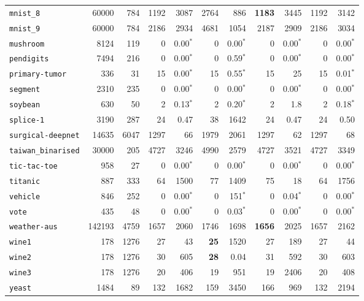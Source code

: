 \begin{tabular}{lccrrrrrrrr}
\texttt{mnist\_8} & \multicolumn{1}{r}{60000} & \multicolumn{1}{r}{784}  & 1192 & 3087 & 2764 & 886 & \textbf{1183} & 3445 & 1192 & 3142\\
\texttt{mnist\_9} & \multicolumn{1}{r}{60000} & \multicolumn{1}{r}{784}  & 2186 & 2934 & 4681 & 1054 & 2187 & 2909 & 2186 & 3034\\
\texttt{mushroom} & \multicolumn{1}{r}{8124} & \multicolumn{1}{r}{119}  & 0 & 0.00$^*$ & 0 & 0.00$^*$ & 0 & 0.00$^*$ & 0 & 0.00$^*$\\
\texttt{pendigits} & \multicolumn{1}{r}{7494} & \multicolumn{1}{r}{216}  & 0 & 0.00$^*$ & 0 & 0.59$^*$ & 0 & 0.00$^*$ & 0 & 0.00$^*$\\
\texttt{primary-tumor} & \multicolumn{1}{r}{336} & \multicolumn{1}{r}{31}  & 15 & 0.00$^*$ & 15 & 0.55$^*$ & 15 & 25 & 15 & 0.01$^*$\\
\texttt{segment} & \multicolumn{1}{r}{2310} & \multicolumn{1}{r}{235}  & 0 & 0.00$^*$ & 0 & 0.00$^*$ & 0 & 0.00$^*$ & 0 & 0.00$^*$\\
\texttt{soybean} & \multicolumn{1}{r}{630} & \multicolumn{1}{r}{50}  & 2 & 0.13$^*$ & 2 & 0.20$^*$ & 2 & 1.8 & 2 & 0.18$^*$\\
\texttt{splice-1} & \multicolumn{1}{r}{3190} & \multicolumn{1}{r}{287}  & 24 & 0.47 & 38 & 1642 & 24 & 0.47 & 24 & 0.50\\
\texttt{surgical-deepnet} & \multicolumn{1}{r}{14635} & \multicolumn{1}{r}{6047}  & 1297 & 66 & 1979 & 2061 & 1297 & 62 & 1297 & 68\\
\texttt{taiwan\_binarised} & \multicolumn{1}{r}{30000} & \multicolumn{1}{r}{205}  & 4727 & 3246 & 4990 & 2579 & 4727 & 3521 & 4727 & 3349\\
\texttt{tic-tac-toe} & \multicolumn{1}{r}{958} & \multicolumn{1}{r}{27}  & 0 & 0.00$^*$ & 0 & 0.00$^*$ & 0 & 0.00$^*$ & 0 & 0.00$^*$\\
\texttt{titanic} & \multicolumn{1}{r}{887} & \multicolumn{1}{r}{333}  & 64 & 1500 & 77 & 1409 & 75 & 18 & 64 & 1756\\
\texttt{vehicle} & \multicolumn{1}{r}{846} & \multicolumn{1}{r}{252}  & 0 & 0.00$^*$ & 0 & 151$^*$ & 0 & 0.04$^*$ & 0 & 0.00$^*$\\
\texttt{vote} & \multicolumn{1}{r}{435} & \multicolumn{1}{r}{48}  & 0 & 0.00$^*$ & 0 & 0.03$^*$ & 0 & 0.00$^*$ & 0 & 0.00$^*$\\
\texttt{weather-aus} & \multicolumn{1}{r}{142193} & \multicolumn{1}{r}{4759}  & 1657 & 2060 & 1746 & 1698 & \textbf{1656} & 2025 & 1657 & 2162\\
\texttt{wine1} & \multicolumn{1}{r}{178} & \multicolumn{1}{r}{1276}  & 27 & 43 & \textbf{25} & 1520 & 27 & 189 & 27 & 44\\
\texttt{wine2} & \multicolumn{1}{r}{178} & \multicolumn{1}{r}{1276}  & 30 & 605 & \textbf{28} & 0.04 & 31 & 592 & 30 & 603\\
\texttt{wine3} & \multicolumn{1}{r}{178} & \multicolumn{1}{r}{1276}  & 20 & 406 & 19 & 951 & 19 & 2406 & 20 & 408\\
\texttt{yeast} & \multicolumn{1}{r}{1484} & \multicolumn{1}{r}{89}  & 132 & 1682 & 159 & 3450 & 166 & 969 & 132 & 2194\\
\bottomrule
\end{tabular}
